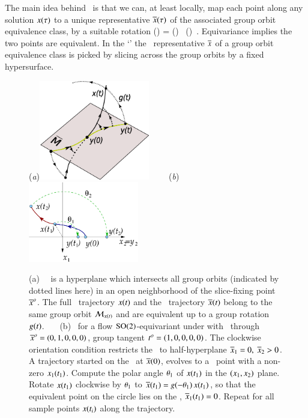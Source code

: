 The main idea behind \mframes\ is that we can, at least locally,
map each point along any solution $x(\tau)$ to a unique
representative $\overline{x}(\tau)$ of the associated
group orbit equivalence class, by a suitable rotation
\beq
\ssp(\tau) = \LieEl(\tau) \, \sspRed(\tau)
\,.
Equivariance implies the two points are equivalent.
In the `\mframes' the \reducedsp\ representative $\overline{x}$
of a group orbit equivalence class is picked by slicing across the group orbits
by a fixed hypersurface.
%
\begin{figure}[ht] \label{fig:ReducTraj}
\begin{center}
(\textit{a})\includegraphics[width=0.43\textwidth]{../Fig/ReducTraj1}
~~~~(\textit{b})\includegraphics[width=0.43\textwidth]{../figs/ESunrot}
\end{center}
\caption{
(a)
\Slice\ \pSRed\ is a hyperplane  which intersects
all
group orbits (indicated by dotted lines here) in an open
neighborhood of the slice-fixing point ${\overline{x}^o}$. The full
\statesp\ trajectory $x(t)$ and the \reducedsp\
trajectory $\overline{x}(t)$ belong to the same group orbit
${\cal M}_{x(t)}$ and are equivalent up to a group rotation
$g(t)$.
~~~(b)
\Mframes\ for a flow $\textrm{SO}(2)$-equivariant under
 with \slice\ through ${\overline{x}^o}=(0,1,0,0,0)$,
group tangent $t^o_{}=(1,0,0,0,0)$. The clockwise
orientation condition restricts the \slice\ to half-hyperplane
$\overline{x}_1=0,\;\overline{x}_2>0$. A trajectory started on the
\slice\ at $\overline{x}(0)$, evolves to a \statesp\ point with a
non-zero $x_1(t_1)$. Compute the polar angle ${\bf \theta}_1$
of $x(t_1)$ in the $(x_1,x_2)$ plane. Rotate $x(t_1)$
clockwise by ${\bf \theta}_1$ to $\overline{x}(t_1) =
g(-{\bf \theta}_1)\,x(t_1)$, so that the equivalent point
on the circle lies on the \slice, $\overline{x}_1(t_1) =0$. Repeat
for all sample points $x(t_i)$ along the trajectory.
}
\end{figure}
%

